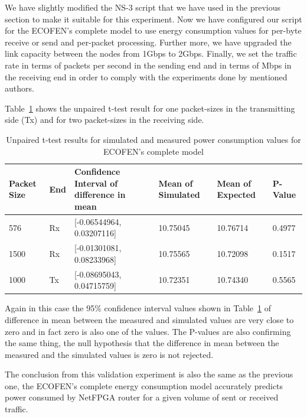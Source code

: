 We have slightly modified the NS-3 script that we have used in the previous section to make it suitable for this experiment. Now we have configured our script for the ECOFEN's complete model to use energy consumption values for per-byte receive or send and per-packet processing. Further more, we have upgraded the link capacity between the nodes from 1Gbps to 2Gbps. Finally, we set the traffic rate  in terms of packets per second in the sending end and in terms of Mbps in the receiving end in order to comply with the experiments done by mentioned authors. 

Table~\ref{table:complettest} shows the unpaired t-test result for one packet-sizes in the transmitting side (Tx) and for two packet-sizes in the receiving side. 

\begin{table}
	\begin{tabular}{|p{1.3cm}|p{0.7cm}|p{4.6cm}|p{2.1cm}|p{2.1cm}|p{1.2cm}|} 
		\hline 
		\textbf{Packet Size} & End &\textbf{Confidence Interval of difference in mean} & \textbf{Mean of Simulated} & \textbf{Mean of Expected}& \textbf{P-Value}\\ 
		\hline 
		576 &	Rx&	[-0.06544964, 0.03207116]&	10.75045&	10.76714&	0.4977\\
		\hline
		1500&	Rx&	[-0.01301081, 0.08233968]&	10.75565&	10.72098&	0.1517\\ 
		\hline
		1000&	Tx&	[-0.08695043, 0.04715759]&	10.72351&	10.74340&	0.5565\\ 
		\hline	 
	\end{tabular} 
	\caption{Unpaired t-test results for simulated and measured power consumption values for ECOFEN's complete model}
	\label{table:complettest}
\end{table}

Again in this case the 95\% confidence interval values shown in Table~\ref{table:complettest} of difference in mean between the measured and simulated values are very close to zero and in fact zero is also one of the values. The P-values are also confirming the same thing, the null hypothesis that the difference in mean between the measured and the simulated values is zero is not rejected. 

The conclusion from this validation experiment is also the same as the previous one, the ECOFEN's complete energy consumption model accurately predicts power consumed by NetFPGA router for a given volume of sent or received traffic.  

 

